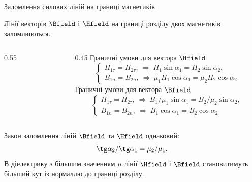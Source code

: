 \documentclass[onlytextwidth]{beamer}
\begin{document}
\begin{frame}{Заломлення силових ліній на границі магнетиків}{}
	\begin{block}{}\justifying
		Лінії векторів $\Bfield$ і $\Hfield$ на границі розділу двох
		магнетиків заломлюються.
	\end{block}
	\begin{columns}
		\begin{column}{0.55\linewidth}\centering
			
		\end{column}
		\
		\begin{column}{0.45\linewidth}\small
			Граничні умови для вектора $\Hfield$
			\begin{equation*}
				\begin{cases}
					H_{1\tau} = H_{2\tau},\ \Rightarrow\ H_1\sin\alpha_1 = H_2\sin\alpha_2, \\
					B_{1n} = B_{2n},\ \Rightarrow\ \mu_1H_1\cos\alpha_1 =
					\mu_2H_2\cos\alpha_2
				\end{cases}
			\end{equation*}
			Граничні умови для вектора $\Bfield$
			\begin{equation*}
				\begin{cases}
					H_{1\tau} = H_{2\tau},\ \Rightarrow\ B_1/\mu_1\sin\alpha_1 =
					B_2/\mu_2\sin\alpha_2, \\
					B_{1n} = B_{2n},\ \Rightarrow\ B_1\cos\alpha_1 =
					B_2\cos\alpha_2
				\end{cases}
			\end{equation*}
		\end{column}
	\end{columns}
	\begin{block}{}\justifying
		Закон заломлення ліній $\Bfield$ та $\Hfield$ однаковий:
		\begin{equation*}
			\tg\alpha_2 / \tg\alpha_1 = \mu_2 / \mu_1.
		\end{equation*}
		В діелектрику з більшим значенням $\mu$ лінії $\Hfield$ і $\Bfield$
		становитимуть більший кут із нормаллю до границі розділу.
	\end{block}
\end{frame}
\end{document}
